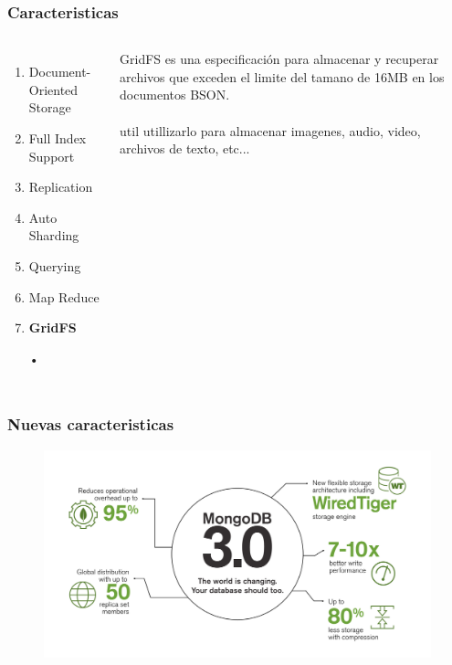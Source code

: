 \documentclass{beamer}
\begin{document}
\begin{frame}
\frametitle{Caracteristicas}
\begin{columns}[c] %

\begin{enumerate}
\item Document-Oriented Storage
\item Full Index Support
\item Replication
\item Auto Sharding
\item Querying
\item Map Reduce
\item \textbf{GridFS}
\item[•]	
\end{enumerate}

GridFS es una especificaci\'on para almacenar y recuperar archivos que exceden el limite del tamano de 16MB en los documentos BSON.
\\~\\
util utillizarlo para almacenar imagenes, audio, video, archivos de texto, etc...
\end{columns}
\end{frame}

\begin{frame}
\frametitle{Nuevas caracteristicas}
\begin{figure}
\includegraphics[width=0.8\linewidth]{mongodb3.png}
\end{figure}
\end{frame}
\end{document}

